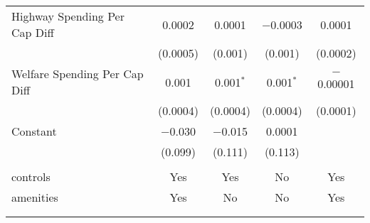 \begin{table}[!htbp]
\begin{tabular}{@{\extracolsep{5pt}}lcccc}
  Highway Spending Per Cap Diff & 0.0002 & 0.0001 & $-$0.0003 & 0.0001 \\ 
  & (0.0005) & (0.001) & (0.001) & (0.0002) \\ 
  Welfare Spending Per Cap Diff & 0.001 & 0.001$^{*}$ & 0.001$^{*}$ & $-$0.00001 \\ 
  & (0.0004) & (0.0004) & (0.0004) & (0.0001) \\ 
  Constant & $-$0.030 & $-$0.015 & 0.0001 &  \\ 
  & (0.099) & (0.111) & (0.113) &  \\ 
 \hline \\[-1.8ex] 
controls & Yes & Yes & No & Yes \\ 
amenities & Yes & No & No & Yes \\ 
\hline \\[-1.8ex] 
\hline 
\hline \\[-1.8ex] 
\end{tabular} 
\end{table} 
